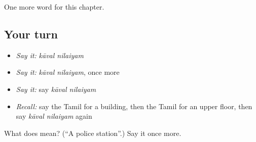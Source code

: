 \begin{grammarlens}[title={What you've built}]
One more word for this chapter.
\end{grammarlens}

\subsection*{Your turn}
\begin{itemize}
\raggedright
  \item \emph{Say it:} \emph{kāval nilaiyam}
  \item \emph{Say it:} \emph{kāval nilaiyam}, once more
  \item \emph{Say it:} say \emph{kāval nilaiyam}
  \item \emph{Recall:} say the Tamil for a building, then the Tamil for an upper floor, then say \emph{kāval nilaiyam} again
\end{itemize}

\begin{tcolorbox}[breakable,colback=teal!4,colframe=teal!35!black,title={Before you move on}]
What does   mean? (\textquotedblleft{}A police station\textquotedblright{}.) Say it once more.
\end{tcolorbox}
